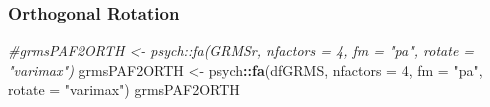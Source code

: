 \documentclass[
  english,
]{book}
\newenvironment{Shaded}{\begin{snugshade}}{\end{snugshade}}
\newcommand{\CommentTok}[1]{\textcolor[rgb]{0.56,0.35,0.01}{\textit{#1}}}
\newcommand{\DataTypeTok}[1]{\textcolor[rgb]{0.13,0.29,0.53}{#1}}
\newcommand{\DecValTok}[1]{\textcolor[rgb]{0.00,0.00,0.81}{#1}}
\newcommand{\KeywordTok}[1]{\textcolor[rgb]{0.13,0.29,0.53}{\textbf{#1}}}
\newcommand{\NormalTok}[1]{#1}
\newcommand{\OperatorTok}[1]{\textcolor[rgb]{0.81,0.36,0.00}{\textbf{#1}}}
\newcommand{\StringTok}[1]{\textcolor[rgb]{0.31,0.60,0.02}{#1}}
\begin{document}
\hypertarget{orthogonal-rotation-1}{%
\subsubsection{Orthogonal Rotation}\label{orthogonal-rotation-1}}

\begin{Shaded}
\begin{Highlighting}[]
\CommentTok{#grmsPAF2ORTH <- psych::fa(GRMSr, nfactors = 4, fm = "pa", rotate = "varimax")}
\NormalTok{grmsPAF2ORTH <-}\StringTok{ }\NormalTok{psych}\OperatorTok{::}\KeywordTok{fa}\NormalTok{(dfGRMS, }\DataTypeTok{nfactors =} \DecValTok{4}\NormalTok{, }\DataTypeTok{fm =} \StringTok{"pa"}\NormalTok{, }\DataTypeTok{rotate =} \StringTok{"varimax"}\NormalTok{)}
\NormalTok{grmsPAF2ORTH}
\end{Highlighting}
\end{Shaded}
\end{document}
